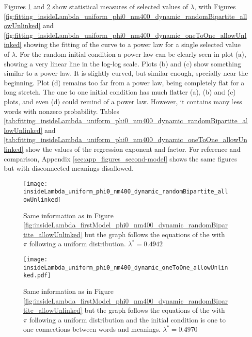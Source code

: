 Figures \ref{fig:insideLambda_uniform_phi0_nm400_dynamic_randomBipartite_allowUnlinked} and \ref{fig:insideLambda_uniform_phi0_nm400_dynamic_oneToOne_allowUnlinked} show statistical measures of selected values of $\lambda$, with Figures \ref{fig:fitting_insideLambda_uniform_phi0_nm400_dynamic_randomBipartite_allowUnlinked} and \ref{fig:fitting_insideLambda_uniform_phi0_nm400_dynamic_oneToOne_allowUnlinked} showing the fitting of the curve to a power law for a single selected value of $\lambda$.
For the random initial condition a power law can be clearly seen in plot (a), showing a very linear line in the log-log scale.
Plots (b) and (c) show something similar to a power law.
It is slightly curved, but similar enough, specially near the beginning.
Plot (d) remains too far from a power law, being completely flat for a long stretch.
The one to one initial condition has much flatter (a), (b) and (c) plots, and even (d) could remind of a power law.
However, it contains many less words with nonzero probability.
Tables \ref{tab:fitting_insideLambda_uniform_phi0_nm400_dynamic_randomBipartite_allowUnlinked} and \ref{tab:fitting_insideLambda_uniform_phi0_nm400_dynamic_oneToOne_allowUnlinked} show the values of the regression exponent and factor.
For reference and comparison, Appendix \ref{sec:app_figures_second-model} shows the same figures but with disconnected meanings disallowed.

\begin{figure}
  \centering
  \texttt{[image: insideLambda\_uniform\_phi0\_nm400\_dynamic\_randomBipartite\_allowUnlinked]}
  \caption{Same information as in Figure \ref{fig:insideLambda_firstModel_phi0_nm400_dynamic_randomBipartite_allowUnlinked} but the graph follows the equations of the \secondmodel{} with $\pi$ following a uniform distribution. $\lambda^* = 0.4942$}
  \label{fig:insideLambda_uniform_phi0_nm400_dynamic_randomBipartite_allowUnlinked}
\end{figure}

\begin{figure}
  \centering
  \texttt{[image: insideLambda\_uniform\_phi0\_nm400\_dynamic\_oneToOne\_allowUnlinked.pdf]}
  \caption{Same information as in Figure \ref{fig:insideLambda_firstModel_phi0_nm400_dynamic_randomBipartite_allowUnlinked} but the graph follows the equations of the \secondmodel{} with $\pi$ following a uniform distribution and the initial condition is one to one connections between words and meanings. $\lambda^* = 0.4970$}
  \label{fig:insideLambda_uniform_phi0_nm400_dynamic_oneToOne_allowUnlinked}
\end{figure}

